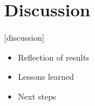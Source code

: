 \section{Discussion}

[discussion]

\begin{itemize}
    \item Reflection of results
    \item Lessons learned
    \item Next steps
\end{itemize}

